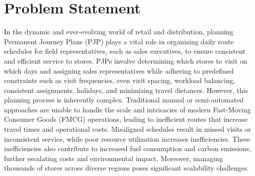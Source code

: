 


\section{Problem Statement}



In the dynamic and ever-evolving world of retail and distribution, planning Permanent Journey Plans (PJP) plays a vital role in organizing daily route schedules for field representatives, such as sales executives, to ensure consistent and efficient service to stores. PJPs involve determining which stores to visit on which days and assigning sales representatives while adhering to predefined constraints such as visit frequencies, even visit spacing, workload balancing, consistent assignments, holidays, and minimizing travel distances.
However, this planning process is inherently complex. Traditional manual or semi-automated approaches are unable to handle the scale and intricacies of modern Fast-Moving Consumer Goods (FMCG) operations, leading to inefficient routes that increase travel times and operational costs. Misaligned schedules result in missed visits or inconsistent service, while poor resource utilization increases inefficiencies. These inefficiencies also contribute to increased fuel consumption and carbon emissions, further escalating costs and environmental impact. Moreover, managing thousands of stores across diverse regions poses significant scalability challenges.

